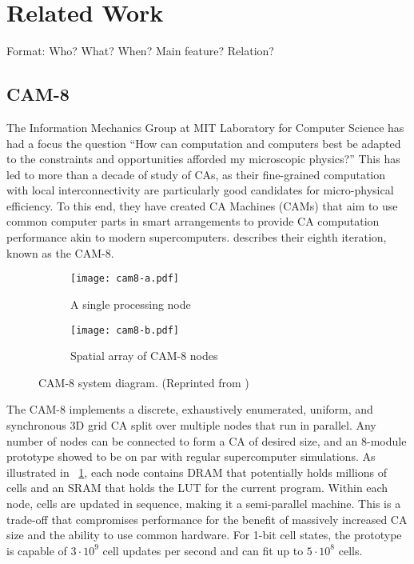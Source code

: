 
\section{Related Work}

\TODO

Format: Who? What? When? Main feature? Relation?

\subsection{CAM-8}


The Information Mechanics Group at MIT Laboratory for Computer Science has had a focus the question ``How can computation and computers best be adapted to the constraints and opportunities afforded my microscopic physics?''
This has led to more than a decade of study of CAs, as their fine-grained computation with local interconnectivity are particularly good candidates for micro-physical efficiency.
To this end, they have created CA Machines (CAMs) that aim to use common computer parts in smart arrangements to provide CA computation performance akin to modern supercomputers.
\cite{margolus1996cam8} describes their eighth iteration, known as the CAM-8.

\begin{figure}[!ht]
    \centering
    \begin{subfigure}{0.48\textwidth}
        \centering
        \texttt{[image: cam8-a.pdf]}
        \caption{A single processing node}
    \end{subfigure}
    \begin{subfigure}{0.48\textwidth}
        \centering
        \texttt{[image: cam8-b.pdf]}
        \caption{Spatial array of CAM-8 nodes}
    \end{subfigure}
    \caption[CAM-8 system diagram]{
        CAM-8 system diagram.
        (Reprinted from \cite{margolus1996cam8})
    }
    \label{fig:cam-8}
\end{figure}

The CAM-8 implements a discrete, exhaustively enumerated, uniform, and synchronous 3D grid CA split over multiple nodes that run in parallel.
Any number of nodes can be connected to form a CA of desired size, and an 8-module prototype showed to be on par with regular supercomputer simulations.
As illustrated in \figurename~\ref{fig:cam-8}, each node contains DRAM that potentially holds millions of cells and an SRAM that holds the LUT for the current program.
Within each node, cells are updated in sequence, making it a semi-parallel machine.
This is a trade-off that compromises performance for the benefit of massively increased CA size and the ability to use common hardware.
For 1-bit cell states, the prototype is capable of $3 \cdot 10^9$ cell updates per second and can fit up to $5 \cdot 10^8$ cells.

